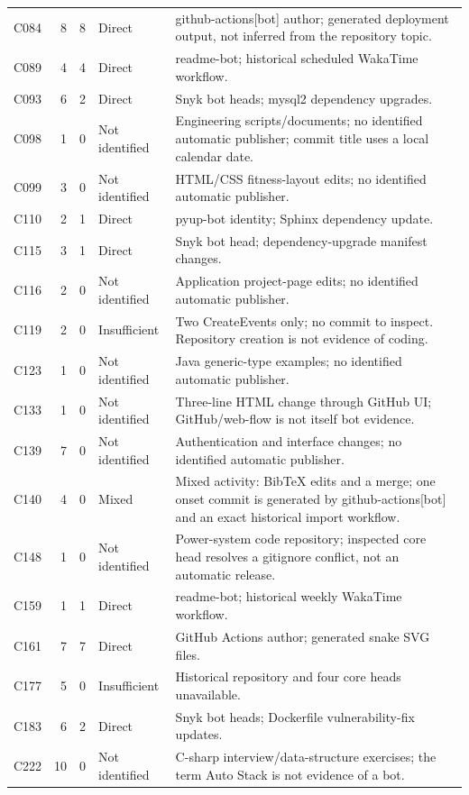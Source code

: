 {\begin{longtable}{@{}p{}rrp{}p{}@{}}
C084 & 8 & 8 & Direct & github-actions[bot] author; generated deployment output, not inferred from the repository topic. \\
C089 & 4 & 4 & Direct & readme-bot; historical scheduled WakaTime workflow. \\
C093 & 6 & 2 & Direct & Snyk bot heads; mysql2 dependency upgrades. \\
C098 & 1 & 0 & Not identified & Engineering scripts/documents; no identified automatic publisher; commit title uses a local calendar date. \\
C099 & 3 & 0 & Not identified & HTML/CSS fitness-layout edits; no identified automatic publisher. \\
C110 & 2 & 1 & Direct & pyup-bot identity; Sphinx dependency update. \\
C115 & 3 & 1 & Direct & Snyk bot head; dependency-upgrade manifest changes. \\
C116 & 2 & 0 & Not identified & Application project-page edits; no identified automatic publisher. \\
C119 & 2 & 0 & Insufficient & Two CreateEvents only; no commit to inspect. Repository creation is not evidence of coding. \\
C123 & 1 & 0 & Not identified & Java generic-type examples; no identified automatic publisher. \\
C133 & 1 & 0 & Not identified & Three-line HTML change through GitHub UI; GitHub/web-flow is not itself bot evidence. \\
C139 & 7 & 0 & Not identified & Authentication and interface changes; no identified automatic publisher. \\
C140 & 4 & 0 & Mixed & Mixed activity: BibTeX edits and a merge; one onset commit is generated by github-actions[bot] and an exact historical import workflow. \\
C148 & 1 & 0 & Not identified & Power-system code repository; inspected core head resolves a gitignore conflict, not an automatic release. \\
C159 & 1 & 1 & Direct & readme-bot; historical weekly WakaTime workflow. \\
C161 & 7 & 7 & Direct & GitHub Actions author; generated snake SVG files. \\
C177 & 5 & 0 & Insufficient & Historical repository and four core heads unavailable. \\
C183 & 6 & 2 & Direct & Snyk bot heads; Dockerfile vulnerability-fix updates. \\
C222 & 10 & 0 & Not identified & C-sharp interview/data-structure exercises; the term Auto Stack is not evidence of a bot. \\

\end{longtable}}
